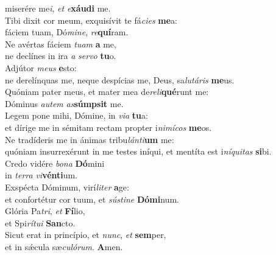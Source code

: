 \evenverse miserére me\textit{i}, \textit{et} \textit{e}\textbf{xáu}\textbf{di} me.\\
\oddverse Tibi dixit cor meum, exquisívit te fá\textit{ci}\textit{es} \textbf{me}a:~\*\\
\oddverse fáciem tuam, Dó\textit{mi}\textit{ne}, \textit{re}\textbf{quí}ram.\\
\evenverse Ne avértas fáciem \textit{tu}\textit{am} \textbf{a} me,~\*\\
\evenverse ne declínes in ira \textit{a} \textit{ser}\textit{vo} \textbf{tu}o.\\
\oddverse Adjútor \textit{me}\textit{us} \textbf{e}sto:~\*\\
\oddverse ne derelínquas me, neque despícias me, Deus, sa\textit{lu}\textit{tá}\textit{ris} \textbf{me}us.\\
\evenverse Quóniam pater meus, et mater mea de\textit{re}\textit{li}\textbf{qué}runt me:~\*\\
\evenverse Dóminus \textit{au}\textit{tem} \textit{as}\textbf{súm}\textbf{psit} me.\\
\oddverse Legem pone mihi, Dómine, in \textit{vi}\textit{a} \textbf{tu}a:~\*\\
\oddverse et dírige me in sémitam rectam propter i\textit{ni}\textit{mí}\textit{cos} \textbf{me}os.\\
\evenverse Ne tradíderis me in ánimas tribu\textit{lán}\textit{ti}\textbf{um} me:~\*\\
\evenverse quóniam insurrexérunt in me testes iníqui, et mentíta est i\textit{ní}\textit{qui}\textit{tas} \textbf{si}bi.\\
\oddverse Credo vidére \textit{bo}\textit{na} \textbf{Dó}mini~\*\\
\oddverse in \textit{ter}\textit{ra} \textit{vi}\textbf{vén}\textbf{ti}um.\\
\evenverse Exspécta Dóminum, virí\textit{li}\textit{ter} \textbf{a}ge:~\*\\
\evenverse et confortétur cor tuum, et \textit{sú}\textit{sti}\textit{ne} \textbf{Dó}\textbf{mi}num.\\
\oddverse Glória Pa\textit{tri}, \textit{et} \textbf{Fí}lio,~\*\\
\oddverse et Spi\textit{rí}\textit{tu}\textit{i} \textbf{San}cto.\\
\evenverse Sicut erat in princípio, et \textit{nunc}, \textit{et} \textbf{sem}per,~\*\\
\evenverse et in sǽcula sæ\textit{cu}\textit{ló}\textit{rum}. \textbf{A}men.\\
